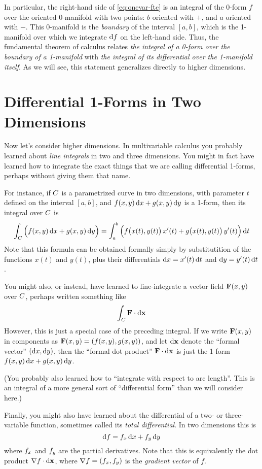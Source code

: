 \documentclass[12pt]{amsart}
\begin{document}
In particular, the right-hand side of \cref{eq:onevar-ftc} is an integral of the 0-form $f$ over the oriented $0$-manifold with two points: $b$ oriented with $+$, and $a$ oriented with $-$.
This 0-manifold is the \emph{boundary} of the interval $[a,b]$, which is the 1-manifold over which we integrate ${\mathrm{d} f}$ on the left-hand side.
Thus, the fundamental theorem of calculus relates \emph{the integral of a 0-form over the boundary of a 1-manifold} with \emph{the integral of its differential over the 1-manifold itself}.
As we will see, this statement generalizes directly to higher dimensions.


\section{Differential 1-Forms in Two Dimensions}
\label{sec:1forms-in-2D}

Now let's consider higher dimensions.
In multivariable calculus you probably learned about \emph{line integrals} in two and three dimensions.
You might in fact have learned how to integrate the exact things that we are calling differential 1-forms, perhaps without giving them that name.

For instance, if $C$ is a parametrized curve in two dimensions, with parameter $t$ defined on the interval $[a,b]$, and $f(x,y)\,{\mathrm{d} x} + g(x,y)\,{\mathrm{d} y}$ is a 1-form, then its integral over $C$ is
\[ \int_{C} \Big(f(x,y)\,{\mathrm{d} x} + g(x,y)\,{\mathrm{d} y}\Big) = \int_a^b \Big( f\big(x(t),y(t)\big)\, x'(t) + g\big(x(t),y(t)\big)\,y'(t)\Big) \,{\mathrm{d} t} \]
Note that this formula can be obtained formally simply by substitutition of the functions $x(t)$ and $y(t)$, plus their differentials ${\mathrm{d} x} = x'(t)\,{\mathrm{d} t}$ and ${\mathrm{d} y} = y'(t)\,{\mathrm{d} t}$.

You might also, or instead, have learned to line-integrate a vector field $\mathbf{F}(x,y)$ over $C$, perhaps written something like
\[ \int_{C} \mathbf{F} \cdot {\ensuremath{\mathrm{d} \mathbf{x}}} \]
However, this is just a special case of the preceding integral.
If we write $\mathbf{F}(x,y)$ in components as $\mathbf{F}(x,y) = (f(x,y),g(x,y))$, and let ${\mathrm{d} \mathbf{x}}$ denote the ``formal vector'' $({\mathrm{d} x},{\mathrm{d} y})$, then the ``formal dot product'' $\mathbf{F} \cdot {\ensuremath{\mathrm{d} \mathbf{x}}}$ is just the 1-form $f(x,y)\,{\mathrm{d} x} + g(x,y)\,{\mathrm{d} y}$.

(You probably also learned how to ``integrate with respect to arc length''.
This is an integral of a more general sort of ``differential form'' than we will consider here.)

Finally, you might also have learned about the differential of a two- or three-variable function, sometimes called its \emph{total differential}.
In two dimensions this is
\begin{equation}
  {\ensuremath{\mathrm{d} f}} = {f}_{x} \,{\mathrm{d} x} + {f}_{y} \,{\mathrm{d} y}\label{eq:differential-of-a-0form-in-2D}
\end{equation}
where ${f}_{x}$ and ${f}_{y}$ are the partial derivatives.
Note that this is equivalently the dot product $\nabla f \cdot {\ensuremath{\mathrm{d} \mathbf{x}}}$, where $\nabla f = ({f}_{x},{f}_{y})$ is the \emph{gradient vector} of $f$.
\end{document}
